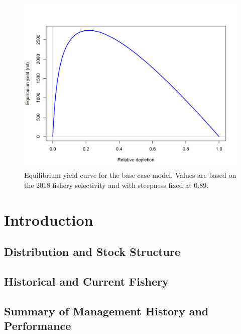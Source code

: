 \documentclass[12pt,]{article}
\begin{document}
\FloatBarrier

\begin{figure}
\centering
\includegraphics{r4ss/plots_mod1/yield1_yield_curve.png}
\caption{Equilibrium yield curve for the base case model. Values are
based on the 2018 fishery selectivity and with steepness fixed at 0.89.
\label{fig:Yield_all}}
\end{figure}

\FloatBarrier

\newpage

\renewcommand{\thefigure}{\arabic{figure}}
\renewcommand{\thetable}{\arabic{table}}

\setcounter{figure}{0} \setcounter{table}{0}


\section{Introduction}\label{introduction}

\subsection{Distribution and Stock
Structure}\label{distribution-and-stock-structure}

\subsection{Historical and Current
Fishery}\label{historical-and-current-fishery}

\subsection{Summary of Management History and
Performance}\label{summary-of-management-history-and-performance}
\end{document}
